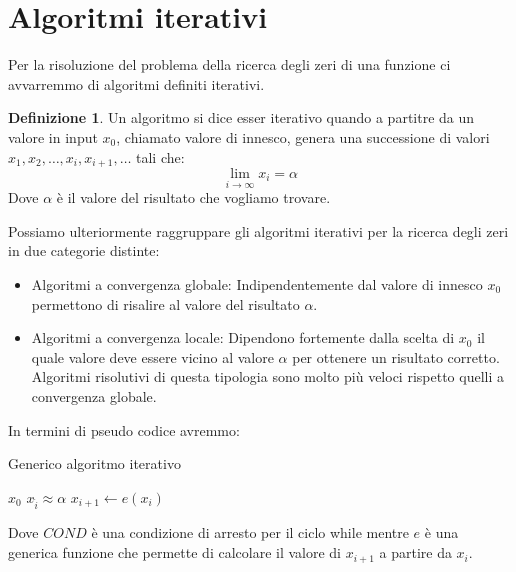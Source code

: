 \documentclass[12pt, a4paper]{book}
\theoremstyle{definition}
\newtheorem{defn}{Definizione}[section]
\begin{document}
\section{Algoritmi iterativi}
\begin{flushleft}
Per la risoluzione del problema della ricerca degli zeri di una funzione ci avvarremmo di algoritmi definiti iterativi.
\begin{defn}
	Un algoritmo si dice esser iterativo quando a partitre da un valore in input $x_{0}$, chiamato valore di innesco,  genera una successione di valori $x_{1},x_{2}, \dots, x_{i},  x_{i+1}, \dots$ tali che:
	\[
		\lim_{i \rightarrow \infty} x_{i} = \alpha
	\]
	Dove $\alpha$ è il valore del risultato che vogliamo trovare.
\end{defn}

Possiamo ulteriormente raggruppare gli algoritmi iterativi per la ricerca degli zeri in due categorie distinte: 
\begin{itemize}
	\item Algoritmi a convergenza globale: Indipendentemente dal valore di innesco $x_{0}$ permettono di risalire al valore del risultato $\alpha$.
	\item Algoritmi a convergenza locale: Dipendono fortemente dalla scelta di $x_{0}$ il quale valore deve essere vicino al valore $\alpha$ per ottenere un risultato corretto.  Algoritmi risolutivi di questa tipologia sono molto più veloci rispetto quelli a convergenza globale.
\end{itemize}

In termini di pseudo codice avremmo: 

\begin{algorithm}
\caption{Generico algoritmo iterativo}
	\begin{algorithmic} 
		\REQUIRE $x_{0}$
		\ENSURE $x_{\hat{i}} \approx \alpha$
		\STATE $ x_{i + 1} \leftarrow  e(x_{i})$
		\ENDWHILE
\end{algorithmic}
\end{algorithm}

Dove  $COND$ è una condizione di arresto per il ciclo while mentre $e$ è una generica funzione che permette di calcolare il valore di $x_{i+1}$ a partire da $x_{i}$.


\end{flushleft}
\end{document}
